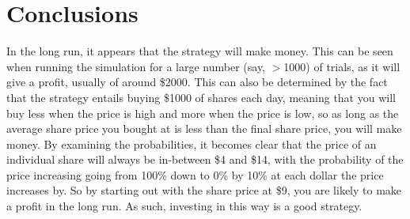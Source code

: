 \documentclass{article}
\begin{document}
    \section{Conclusions}
    
    In the long run, it appears that the strategy will make money.  This can be
    seen when running the simulation for a large number (say, $>$1000) of
    trials, as it will give a profit, usually of around \$2000.  This can also
    be determined by the fact that the strategy entails buying \$1000 of shares
    each day, meaning that you will buy less when the price is high and more
    when the price is low, so as long as the average share price you bought at
    is less than the final share price, you will make money. By examining the
    probabilities, it becomes clear that the price of an individual share will
    always be in-between \$4 and \$14, with the probability of the price
    increasing going from 100\% down to 0\% by 10\% at each dollar the price
    increases by. So by starting out with the share price at \$9, you are
    likely to make a profit in the long run. As such, investing in this way is
    a good strategy.
\end{document}
